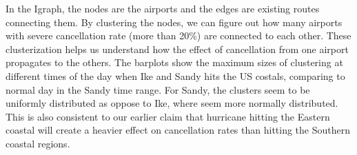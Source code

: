 In the Igraph, the nodes are the airports and the edges are existing routes connecting them. By clustering the nodes, we can figure out how many airports with severe cancellation rate (more than 20\%) are connected to each other. These clusterization helps us understand how the effect of cancellation from one airport propagates to the others. The barplots show the maximum sizes of clustering at different times of the day when Ike and Sandy hits the US costals, comparing to normal day in the Sandy time range.  For Sandy, the clusters seem to be uniformly distributed as oppose to Ike, where seem more normally distributed. This is also consistent to our earlier claim that hurricane hitting the Eastern coastal will create a heavier effect on cancellation rates than hitting the Southern coastal regions.

